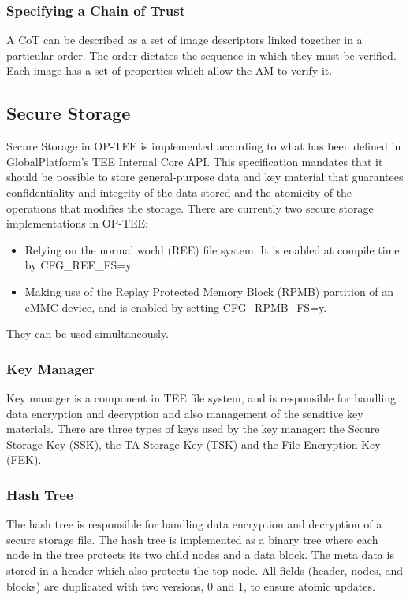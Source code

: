 \documentclass{article}
\begin{document}
\subsubsection{Specifying a Chain of Trust}

A CoT can be described as a set of image descriptors linked together in a particular order. The order dictates the sequence in which they must be verified. Each image has a set of properties which allow the AM to verify it.

\subsection{Secure Storage}

Secure Storage in OP-TEE is implemented according to what has been defined in GlobalPlatform’s TEE Internal Core API. This specification mandates that it should be possible to store general-purpose data and key material that guarantees confidentiality and integrity of the data stored and the atomicity of the operations that modifies the storage. There are currently two secure storage implementations in OP-TEE:
\begin{itemize}
\item Relying on the normal world (REE) file system. It is enabled at compile time by CFG\_REE\_FS=y.
\item Making use of the Replay Protected Memory Block (RPMB) partition of an eMMC device, and is enabled by setting CFG\_RPMB\_FS=y.
\end{itemize}
They can be used simultaneously.

\subsubsection{Key Manager}

Key manager is a component in TEE file system, and is responsible for handling data encryption and decryption and also management of the sensitive key materials. There are three types of keys used by the key manager: the Secure Storage Key (SSK), the TA Storage Key (TSK) and the File Encryption Key (FEK).

\subsubsection{Hash Tree}

The hash tree is responsible for handling data encryption and decryption of a secure storage file. The hash tree is implemented as a binary tree where each node in the tree protects its two child nodes and a data block. The meta data is stored in a header which also protects the top node. All fields (header, nodes, and blocks) are duplicated with two versions, 0 and 1, to ensure atomic updates.
\end{document}
